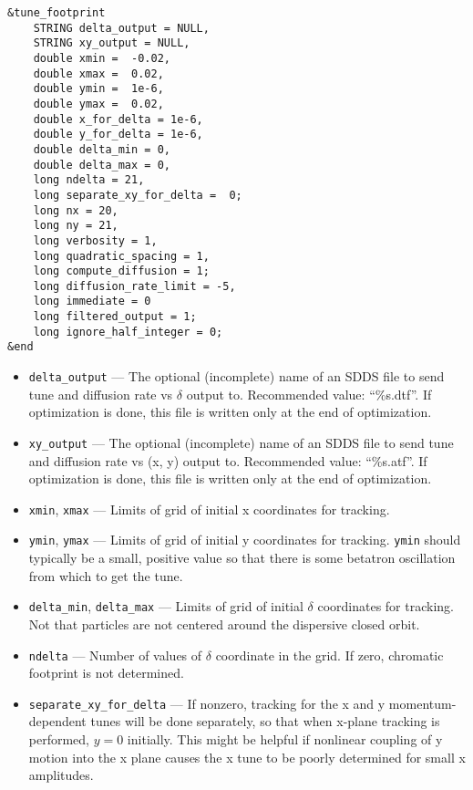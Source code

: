 \documentclass[11pt]{article}
\begin{document}
\begin{verbatim}
&tune_footprint
    STRING delta_output = NULL,
    STRING xy_output = NULL,
    double xmin =  -0.02,
    double xmax =  0.02,
    double ymin =  1e-6,
    double ymax =  0.02,
    double x_for_delta = 1e-6,
    double y_for_delta = 1e-6,
    double delta_min = 0,
    double delta_max = 0,
    long ndelta = 21,
    long separate_xy_for_delta =  0;
    long nx = 20,
    long ny = 21,
    long verbosity = 1,
    long quadratic_spacing = 1,
    long compute_diffusion = 1;
    long diffusion_rate_limit = -5,
    long immediate = 0
    long filtered_output = 1;
    long ignore_half_integer = 0;
&end
\end{verbatim}

\begin{itemize}
\item \verb|delta_output| --- The optional (incomplete) name of an SDDS file to send tune and diffusion rate vs $\delta$ output to.  
 Recommended value: ``\%s.dtf''.  If optimization is done, this file is written only at the end of optimization.
\item \verb|xy_output| --- The optional (incomplete) name of an SDDS file to send tune and diffusion rate vs (x, y) output to.  
 Recommended value: ``\%s.atf''.  If optimization is done, this file is written only at the end of optimization.
\item \verb|xmin|, \verb|xmax| --- Limits of grid of initial x coordinates for tracking.             
\item \verb|ymin|, \verb|ymax| --- Limits of grid of initial y coordinates for tracking.             
 \verb|ymin| should typically be a small, positive value so that there                               
 is some betatron oscillation from which to get the tune.                      
\item \verb|delta_min|, \verb|delta_max| --- Limits of grid of initial $\delta$ coordinates
for tracking.  Not that particles are not centered around the dispersive closed orbit.
\item \verb|ndelta| --- Number of values of $\delta$ coordinate in the grid. If zero, chromatic footprint is not determined.
\item \verb|separate_xy_for_delta| --- If nonzero, tracking for the x and y momentum-dependent tunes will be done 
  separately, so that when x-plane tracking is performed, $y=0$ initially.
  This might be helpful if nonlinear coupling of y motion into the x plane
  causes the x tune to be poorly determined for small x amplitudes.

\end{itemize}
\end{document}
